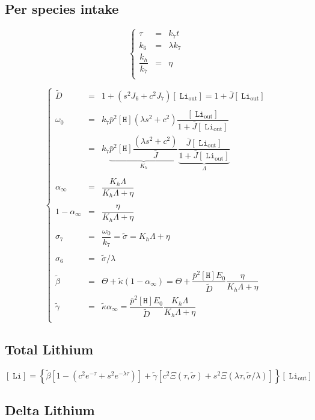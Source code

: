 \documentclass[aps,onecolumn,12pt]{revtex4}
\newcommand{\mychem}[1]{\mathtt{#1}}
\newcommand{\myconc}[1]{\left\lbrack{#1}\right\rbrack}
\newcommand{\spLi}[1]{{~^{\mychem{#1}}\mychem{Li}}}
\newcommand{\Li}[1]{\myconc{\spLi{#1}}}
\newcommand{\spLiOut}[1]{{\spLi{#1}}_{\mathrm{out}}}
\newcommand{\LiOut}[1]{\myconc{\spLiOut{#1}}}
\newcommand{\spproton}{\mychem{H}}
\newcommand{\proton}{\myconc{\spproton}}
\begin{document}
\subsection{Per species intake}
\begin{equation}
\left\lbrace
	\begin{array}{rcl}
	\tau & = & k_7 t\\
	k_6  & = & \lambda k_7\\
	\dfrac{k_h}{k_7} & = & \eta \\
	\end{array}
\right.
\end{equation}

\begin{equation}
\left\lbrace
	\begin{array}{rcl}
	\tilde{D} & = & 1 + \left(s^2J_6+c^2J_7\right) \LiOut{} = 1+\bar{J} \LiOut{}\\
	\\
	\omega_0  & = & k_7 \bar{p}^2 \proton \left(\lambda s^2+c^2\right) \dfrac{ \LiOut{} }{1+\bar{J}\LiOut{}} \\
	& = & k_7 \underbrace{\bar{p}^2 \proton \dfrac{\left(\lambda s^2+c^2\right)}{\bar{J}}}_{K_h}
	\underbrace{ \dfrac{ \bar{J} \LiOut{} }{1+\bar{J}\LiOut{}}}_{\Lambda}\\
	\\
	\alpha_\infty & = & \dfrac{K_h\Lambda}{K_h\Lambda+\eta}\\
	\\
	1-\alpha_\infty & = & \dfrac{\eta}{K_h\Lambda+\eta}\\
	\\
	\sigma_7 & = & \dfrac{\omega_0}{k_7} = \tilde\sigma = K_h\Lambda+\eta\\
	\\
	\sigma_6 & = & \tilde\sigma/\lambda\\
	\\
	\tilde\beta & = & \Theta + \tilde\kappa\left(1-\alpha_\infty\right) = \Theta+\dfrac{\bar{p}^2 \proton E_0}{\tilde{D}}  \dfrac{\eta}{K_h\Lambda+\eta}\\
	\tilde\gamma & = & \tilde\kappa \alpha_\infty = \dfrac{\bar{p}^2 \proton E_0}{\tilde{D}}\dfrac{K_h\Lambda}{K_h\Lambda+\eta}\\
	\end{array}
\right.
\end{equation}

\subsection{Total Lithium}

\begin{equation}
\Li{} = \left\lbrace\tilde\beta\left[ 1 - \left(c^2e^{-\tau}+s^2e^{-\lambda\tau}\right) \right] 
+ \tilde\gamma\left[ c^2\Xi\left(\tau,\tilde\sigma\right) + s^2\Xi\left(\lambda\tau,\tilde\sigma/\lambda\right)\right]\right\rbrace \LiOut{}
\end{equation}

\subsection{Delta Lithium}
\end{document}
